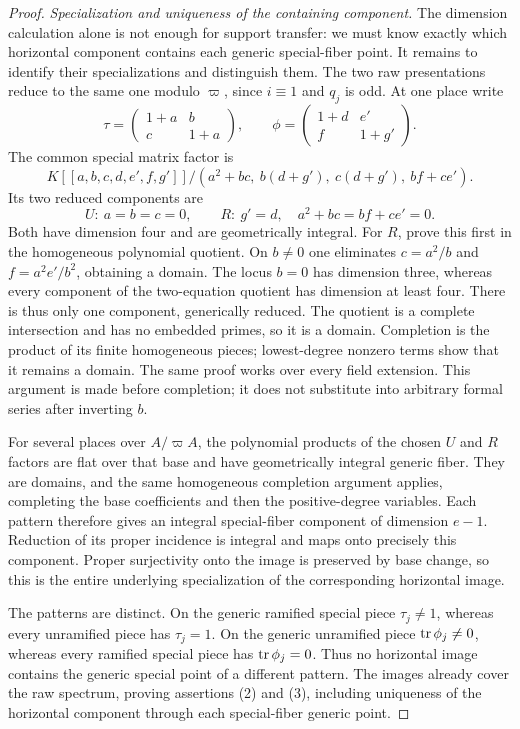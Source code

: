 \begin{proof}
\emph{Specialization and uniqueness of the containing component.}
The dimension calculation alone is not enough for support transfer:
we must know exactly which horizontal component contains each generic
special-fiber point. It remains to identify their specializations and
distinguish them.
The two raw presentations reduce to the same one modulo $\varpi$,
since $i\equiv1$ and $q_j$ is odd.  At one place write
\[
\tau=\begin{pmatrix}1+a&b\\c&1+a\end{pmatrix},\qquad
\phi=\begin{pmatrix}1+d&e'\\f&1+g'\end{pmatrix}.
\]
The common special matrix factor is
\begin{equation}\label{eq:tame-special-ring}
K[[a,b,c,d,e',f,g']]/
 (a^2+bc,\ b(d+g'),\ c(d+g'),\ bf+ce').
\end{equation}
Its two reduced components are
\[
U:\ a=b=c=0,
\qquad
R:\ g'=d,\quad a^2+bc=bf+ce'=0.
\]
Both have dimension four and are geometrically integral.  For $R$,
prove this first in the homogeneous polynomial quotient.  On $b\ne0$
one eliminates $c=a^2/b$ and $f=a^2e'/b^2$, obtaining a domain.
The locus $b=0$ has dimension three, whereas every component of the
two-equation quotient has dimension at least four.  There is thus
only one component, generically reduced.  The quotient is a
complete intersection and has no embedded primes, so it is a
domain.  Completion is the product of its finite homogeneous pieces;
lowest-degree nonzero terms show that it remains a domain.  The
same proof works over every field extension.  This argument is
made before completion; it does not substitute into arbitrary
formal series after inverting $b$.

For several places over $A/\varpi A$, the polynomial products of
the chosen $U$ and $R$ factors are flat over that base and have
geometrically integral generic fiber.  They are domains, and the
same homogeneous completion argument applies, completing the base
coefficients and then the positive-degree variables.  Each pattern
therefore gives an integral special-fiber component of dimension
$e-1$.  Reduction of its proper incidence is integral and maps
onto precisely this component.  Proper surjectivity onto the image
is preserved by base change, so this is the entire underlying
specialization of the corresponding horizontal image.

The patterns are distinct.  On the generic ramified special piece
$\tau_j\ne1$, whereas every unramified piece has $\tau_j=1$.
On the generic unramified piece $\operatorname{tr}\phi_j\ne0$, whereas every
ramified special piece has $\operatorname{tr}\phi_j=0$.  Thus no horizontal image
contains the generic special point of a different pattern.  The
images already cover the raw spectrum, proving assertions (2) and
(3), including uniqueness of the horizontal component through
each special-fiber generic point.
\end{proof}

